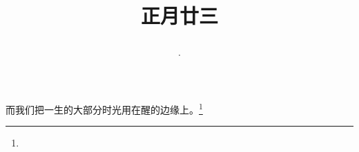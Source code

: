 \title{\date[d=3,m=3,y=2024][year:cn-y,年,month:cn,day:cn,日,·,weekday]·正月廿三 }
而我们把一生的大部分时光用在醒的边缘上。\footnote{ }

